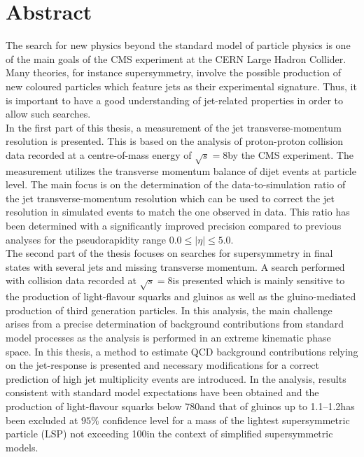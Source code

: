 \section*{Abstract}
The search for new physics beyond the standard model of particle physics is one of the main goals of the CMS experiment at the CERN Large Hadron Collider. Many theories, for instance supersymmetry, involve the possible production of new coloured particles which feature jets as their experimental signature. Thus, it is important to have a good understanding of jet-related properties in order to allow such searches.\\
In the first part of this thesis, a measurement of the jet transverse-momentum resolution is presented. This is based on the analysis of proton-proton collision data recorded at a centre-of-mass energy of $\sqrt{s}=8$\tev by the CMS experiment. The measurement utilizes the transverse momentum balance of dijet events at particle level. The main focus is on the determination of the data-to-simulation ratio of the jet transverse-momentum resolution which can be used to correct the jet resolution in simulated events to match the one observed in data. This ratio has been determined with a significantly improved precision compared to previous analyses for the pseudorapidity range $0.0 \leq |\eta| \leq 5.0$. \\ 
The second part of the thesis focuses on searches for supersymmetry in final states with several jets and missing transverse momentum. A search performed with collision data recorded at $\sqrt{s}=8$\tev is presented which is mainly sensitive to the production of light-flavour squarks and gluinos as well as the gluino-mediated production of third generation particles. In this analysis, the main challenge arises from a precise determination of background contributions from standard model processes as the analysis is performed in an extreme kinematic phase space. In this thesis, a method to estimate QCD background contributions relying on the jet-\pt response is presented and necessary modifications for a correct prediction of high jet multiplicity events are introduced. In the analysis, results consistent with standard model expectations have been obtained and the production of light-flavour squarks below 780\gev and that of gluinos up to 1.1--1.2\tev has been excluded at $95\%$ confidence level for a mass of the lightest supersymmetric particle (LSP) not exceeding 100\gev in the context of simplified supersymmetric models. \\

